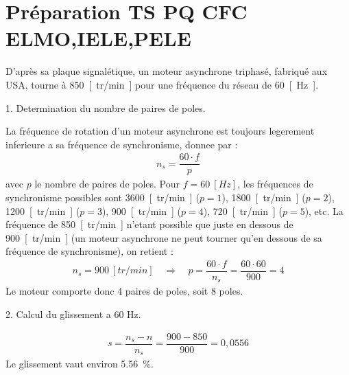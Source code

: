 \documentclass[a4paper,12pt,answers,addpoints]{exam}
\begin{document}
	\unframedsolutions
	\pointsinmargin
	\bracketedpoints
	
\section*{Préparation TS PQ CFC ELMO,IELE,PELE}
\begin{questions}
\question
D'après sa plaque signalétique, un moteur asynchrone triphasé, fabriqué aux USA, tourne à \qty{850}{[tr/min]} pour une fréquence du réseau de \qty{60}{[Hz]}.

\begin{solution}
	
1. Determination du nombre de paires de poles.

La fréquence de rotation d'un moteur asynchrone est toujours legerement inferieure a sa fréquence de synchronisme, donnee par :
\begin{align*}
n_s = \dfrac{60 \cdot f}{p}
\end{align*}
avec $p$ le nombre de paires de poles. Pour $f = \qty{60}{[Hz]}$, les fréquences de synchronisme possibles sont \qty{3600}{[tr/min]} ($p=1$), \qty{1800}{[tr/min]} ($p=2$), \qty{1200}{[tr/min]} ($p=3$), \qty{900}{[tr/min]} ($p=4$), \qty{720}{[tr/min]} ($p=5$), etc. La fréquence de \qty{850}{[tr/min]} n'etant possible que juste en dessous de \qty{900}{[tr/min]} (un moteur asynchrone ne peut tourner qu'en dessous de sa fréquence de synchronisme), on retient :
\begin{align*}
n_s = \qty{900}{[tr/min]} \quad \Rightarrow \quad p = \dfrac{60 \cdot f}{n_s} = \dfrac{60 \cdot 60}{900} = 4
\end{align*}
Le moteur comporte donc 4 paires de poles, soit 8 poles.

2. Calcul du glissement a 60 Hz.

\begin{align*}
s = \dfrac{n_s - n}{n_s} = \dfrac{900 - 850}{900} = 0,0556
\end{align*}
Le glissement vaut environ \qty{5,56}{\%}.


\end{solution}
\end{questions}
\end{document}
